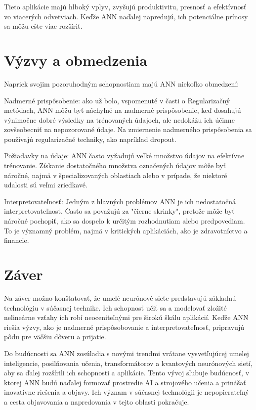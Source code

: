 \documentclass[10pt,twoside,slovak,a4paper]{article}
\begin{document}
Tieto aplikácie majú hlboký vplyv, zvyšujú produktivitu, presnosť a efektívnosť vo viacerých odvetviach. Keďže ANN naďalej napredujú, ich potenciálne prínosy sa môžu ešte viac rozšíriť.
\section{Výzvy a obmedzenia} \label{nejaka}\cite{shukla2022introduction}
Napriek svojim pozoruhodným schopnostiam majú ANN niekoľko obmedzení:
 
Nadmerné prispôsobenie: ako už bolo, vspomenuté v časti o Regularizačný metódach, ANN môžu byť náchylné na nadmerné prispôsobenie, keď dosahujú výnimočne dobré výsledky na trénovaných údajoch, ale nedokážu ich účinne zovšeobecniť na nepozorované údaje. Na zmiernenie nadmerného prispôsobenia sa používajú regularizačné techniky, ako napríklad dropout.
 
Požiadavky na údaje: ANN často vyžadujú veľké množstvo údajov na efektívne trénovanie. Získanie dostatočného množstva označených údajov môže byť náročné, najmä v špecializovaných oblastiach alebo v prípade, že niektoré udalosti sú veľmi zriedkavé.
 
Interpretovateľnosť: Jedným z hlavných problémov ANN je ich nedostatočná interpretovateľnosť. Často sa považujú za "čierne skrinky", pretože môže byť náročné pochopiť, ako sa dospelo k určitým rozhodnutiam alebo predpovediam. To je významný problém, najmä v kritických aplikáciách, ako je zdravotníctvo a financie.
 

\section{Záver} \label{nejaka}
Na záver možno konštatovať, že umelé neurónové siete predstavujú základnú technológiu v súčasnej technike. Ich schopnosť učiť sa a modelovať zložité nelineárne vzťahy ich robí neoceniteľnými pre širokú škálu aplikácií. Keďže ANN riešia výzvy, ako je nadmerné prispôsobovanie a interpretovateľnosť, pripravujú pôdu pre väčšiu dôveru a prijatie.
 
Do budúcnosti sa ANN zosúladia s novými trendmi vrátane vysvetľujúcej umelej inteligencie, posilňovania učenia, transformátorov a kvantových neurónových sietí, aby sa ďalej rozšírili ich schopnosti a aplikácie. Tento vývoj sľubuje budúcnosť, v ktorej ANN budú naďalej formovať prostredie AI a strojového učenia a prinášať inovatívne riešenia a objavy. Ich význam v súčasnej technológii je nepopierateľný a cesta objavovania a napredovania v tejto oblasti pokračuje.


\printbibliography
\end{document}

